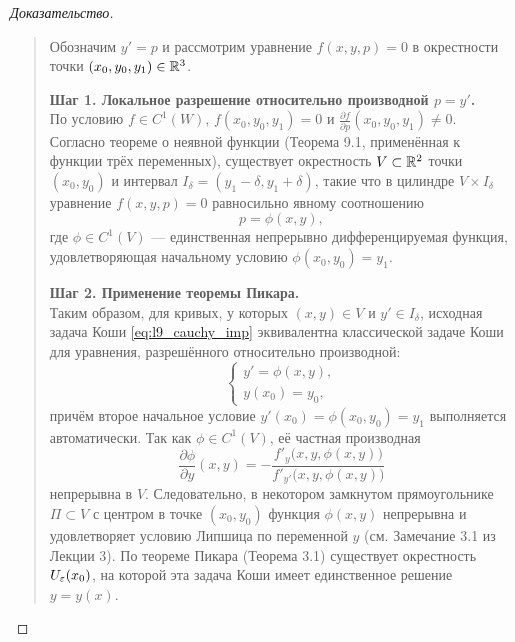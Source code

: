 \begin{proof}[Доказательство]~\\
    \begin{quote}
        Обозначим $y' = p$ и рассмотрим уравнение $f(x, y, p) = 0$ в
        окрестности точки $(x_0, y_0, y_1) \in \mathbb{R}^3$.

        \textbf{Шаг 1. Локальное разрешение относительно производной $p = y'$.}\\
        По условию $f \in C^1(W)$, $f(x_0, y_0, y_1) = 0$ и
        $\frac{\partial f}{\partial p}(x_0, y_0, y_1) \neq 0$. Согласно теореме
        о неявной функции (Теорема 9.1, применённая к функции трёх переменных),
        существует окрестность $V \subset \mathbb{R}^2$ точки $(x_0, y_0)$ и
        интервал $I_\delta = (y_1 - \delta, y_1 + \delta)$, такие что в
        цилиндре $V \times I_\delta$ уравнение $f(x, y, p) = 0$ равносильно
        явному соотношению
        \[
            p = \phi(x, y),
        \]
        где $\phi \in C^1(V)$ — единственная непрерывно дифференцируемая
        функция, удовлетворяющая начальному условию $\phi(x_0, y_0) = y_1$.

        \textbf{Шаг 2. Применение теоремы Пикара.}\\
        Таким образом, для кривых, у которых $(x, y) \in V$ и
        $y' \in I_\delta$, исходная задача Коши \eqref{eq:l9_cauchy_imp}
        эквивалентна классической задаче Коши для уравнения, разрешённого
        относительно производной:
        \[
            \begin{cases}
                y' = \phi(x, y), \\
                y(x_0) = y_0,
            \end{cases}
        \]
        причём второе начальное условие $y'(x_0) = \phi(x_0, y_0) = y_1$
        выполняется автоматически. Так как $\phi \in C^1(V)$, её частная
        производная
        \[
            \frac{\partial \phi}{\partial y}(x, y) =
            -\frac{f'_y\bigl(x, y, \phi(x, y)\bigr)}{f'_{y'}\bigl(x, y, \phi(x, y)\bigr)}
        \]
        непрерывна в $V$. Следовательно, в некотором замкнутом прямоугольнике
        $\Pi \subset V$ с центром в точке $(x_0, y_0)$ функция $\phi(x, y)$
        непрерывна и удовлетворяет условию Липшица по переменной $y$ (см.
        Замечание 3.1 из Лекции 3). По теореме Пикара (Теорема 3.1) существует
        окрестность $U_\varepsilon(x_0)$, на которой эта задача Коши имеет
        единственное решение $y = y(x)$.
    \end{quote}
\end{proof}

